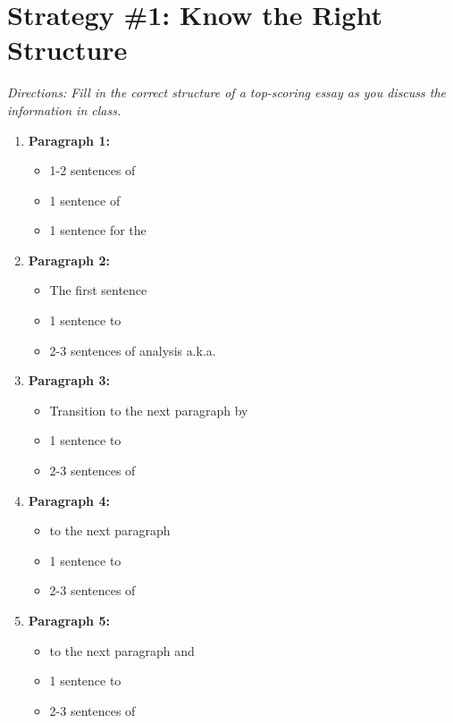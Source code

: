 \section{Strategy \#1: Know the Right Structure}

\textit{Directions: Fill in the correct structure of a top-scoring essay as you discuss the information in class.}

\begin{enumerate}
\item \large{\textbf{Paragraph 1:}} \hrulefill

\begin{itemize}
\item 1-2 sentences of \hrulefill
\item 1 sentence of \hrulefill
\item 1 sentence for the \hrulefill
\end{itemize}

\item \large{\textbf{Paragraph 2:}} \hrulefill

\begin{itemize}
\item The first sentence \hrulefill
\item 1 sentence to \hrulefill
\item 2-3 sentences of analysis a.k.a. \hrulefill
\end{itemize}

\item \large{\textbf{Paragraph 3:}} \hrulefill

\begin{itemize}
\item Transition to the next paragraph by \hrulefill
\item 1 sentence to \hrulefill
\item 2-3 sentences of \hrulefill
\end{itemize}

\item \large{\textbf{Paragraph 4:}} \hrulefill

\begin{itemize}
\item \underline{\hspace{2in}} to the next paragraph 
\item 1 sentence to \hrulefill
\item 2-3 sentences of \hrulefill
\end{itemize}

\item \large{\textbf{Paragraph 5:}} \hrulefill

\begin{itemize}
\item \underline{\hspace{2in}} to the next paragraph and \hrulefill
\item 1 sentence to \hrulefill
\item 2-3 sentences of \hrulefill
\end{itemize}

\end{enumerate}